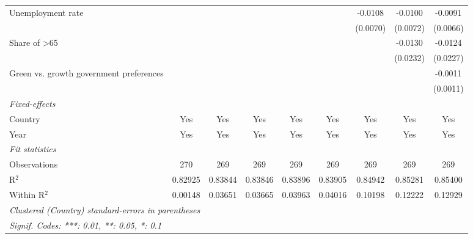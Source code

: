 \begin{table}[htbp]
\begin{tabular}{lcccccccc}
      Unemployment rate                                                       &          &          &          &          &          & -0.0108  & -0.0100       & -0.0091\\   
                                                                              &          &          &          &          &          & (0.0070) & (0.0072)      & (0.0066)\\   
      Share of >65                                                            &          &          &          &          &          &          & -0.0130       & -0.0124\\   
                                                                              &          &          &          &          &          &          & (0.0232)      & (0.0227)\\   
      Green vs. growth government preferences                                 &          &          &          &          &          &          &               & -0.0011\\   
                                                                              &          &          &          &          &          &          &               & (0.0011)\\   
      \midrule
      \emph{Fixed-effects}\\
      Country                                                                 & Yes      & Yes      & Yes      & Yes      & Yes      & Yes      & Yes           & Yes\\  
      Year                                                                    & Yes      & Yes      & Yes      & Yes      & Yes      & Yes      & Yes           & Yes\\  
      \midrule
      \emph{Fit statistics}\\
      Observations                                                            & 270      & 269      & 269      & 269      & 269      & 269      & 269           & 269\\  
      R$^2$                                                                   & 0.82925  & 0.83844  & 0.83846  & 0.83896  & 0.83905  & 0.84942  & 0.85281       & 0.85400\\  
      Within R$^2$                                                            & 0.00148  & 0.03651  & 0.03665  & 0.03963  & 0.04016  & 0.10198  & 0.12222       & 0.12929\\  
      \midrule \midrule
      \multicolumn{9}{l}{\emph{Clustered (Country) standard-errors in parentheses}}\\
      \multicolumn{9}{l}{\emph{Signif. Codes: ***: 0.01, **: 0.05, *: 0.1}}\\
   \end{tabular}
\end{table}


